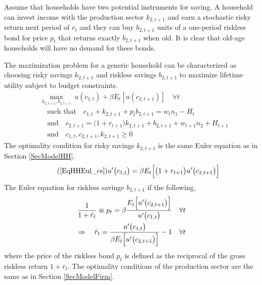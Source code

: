 \documentclass[letterpaper,12pt]{article}
\theoremstyle{definition}
\begin{document}
\begin{spacing}{1.5}
    Assume that households have two potential instruments for saving. A household can invest income with the production sector $k_{2,t+1}$ and earn a stochastic risky return next period of $r_t$ and they can buy $b_{2,t+1}$ units of a one-period riskless bond  for price $p_t$ that returns exactly $b_{2,t+1}$ when old. It is clear that old-age households will have no demand for these bonds.

    The maximization problem for a generic household can be characterized as choosing risky savings $k_{2,t+1}$ and riskless savings $b_{2,t+1}$ to maximize lifetime utility subject to budget constraints.
    \begin{align}
      &\max_{k_{2,t+1},b_{2,t+1}}\: u(c_{1,t}) + \beta E_t\left[u(c_{2,t+1})\right] \quad \forall t \label{EqModelRiskMaxUtil} \\
      &\quad\text{such that}\quad c_{1,t} + k_{2,t+1} + p_t b_{2,t+1} = w_t n_1 - H_t \label{EqModelRisk_bc1} \\
      &\quad\text{and}\quad c_{2,t+1} = \bigl(1+r_{t+1}\bigr)k_{2,t+1} + b_{2,t+1} + w_{t+1}n_2 + H_{t+1} \label{EqModelRisk_bc2} \\
      &\quad\text{and}\quad c_{1,t},c_{2,t+1},k_{2,t+1} \geq 0 \label{EqModelRisk_nonneg}
    \end{align}
    The optimality condition for risky savings $k_{2,t+1}$ is the same Euler equation as in Section \ref{SecModelHH}.
    \begin{equation}\tag{\ref{EqHHEul_cs}}
       u'\bigl(c_{1,t}\bigr) = \beta E_t\Bigl[\bigl(1+r_{t+1}\bigr)u'\bigl(c_{2,t+1}\bigr)\Bigr]
    \end{equation}
    The Euler equation for riskless savinge $b_{2,t+1}$ if the following,
    \begin{equation}\label{EqModelRisk_rbart}
      \begin{split}
        \frac{1}{1 + \bar{r}_t} \equiv p_t = \beta\frac{E_t\Bigl[u'\bigl(c_{2,t+1}\bigr)\Bigr]}{u'\bigl(c_{1,t}\bigr)} \quad \forall t \\
        \Rightarrow\quad \bar{r}_t = \frac{u'\bigl(c_{1,t}\bigr)}{\beta E_t\Bigl[u'\bigl(c_{2,t+1}\bigr)\Bigr]} - 1 \quad\forall t
      \end{split}
    \end{equation}
    where the price of the riskless bond $p_t$ is defined as the reciprocal of the gross riskless return $1 + \bar{r}_t$. The optimality conditions of the production sector are the same as in Section \ref{SecModelFirm}.


\end{spacing}
\end{document}
